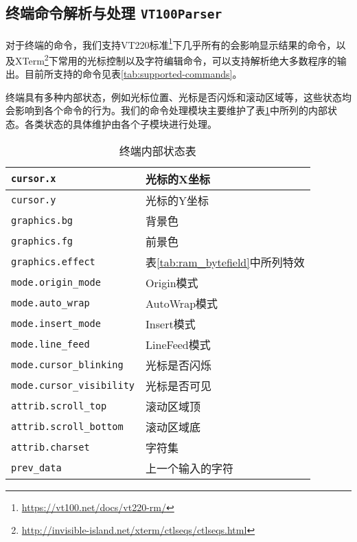  
\subsection{终端命令解析与处理 \texttt{VT100Parser}}

对于终端的命令，我们支持VT220标准\footnote{\url{https://vt100.net/docs/vt220-rm/}}下几乎所有的会影响显示结果的命令，以及XTerm\footnote{\url{http://invisible-island.net/xterm/ctlseqs/ctlseqs.html}}下常用的光标控制以及字符编辑命令，可以支持解析绝大多数程序的输出。目前所支持的命令见表\ref{tab:supported-commands}。

终端具有多种内部状态，例如光标位置、光标是否闪烁和滚动区域等，这些状态均会影响到各个命令的行为。我们的命令处理模块主要维护了表\ref{tab:inner-status}中所列的内部状态。各类状态的具体维护由各个子模块进行处理。

\begin{table}
	\centering
	\caption{终端内部状态表}
	\label{tab:inner-status}
	\begin{tabular}{|l|l|} \hline
		\texttt{cursor.x} & 光标的X坐标 \\ \hline
		\texttt{cursor.y} & 光标的Y坐标 \\ \hline
		\texttt{graphics.bg} & 背景色 \\ \hline
		\texttt{graphics.fg} & 前景色 \\ \hline
		\texttt{graphics.effect} & 表\ref{tab:ram_bytefield}中所列特效 \\ \hline
		\texttt{mode.origin\_mode} & Origin模式 \\ \hline
		\texttt{mode.auto\_wrap} & AutoWrap模式 \\ \hline
		\texttt{mode.insert\_mode} & Insert模式 \\ \hline
		\texttt{mode.line\_feed} & LineFeed模式 \\ \hline
		\texttt{mode.cursor\_blinking} & 光标是否闪烁 \\ \hline
		\texttt{mode.cursor\_visibility} & 光标是否可见 \\ \hline
		\texttt{attrib.scroll\_top} & 滚动区域顶 \\ \hline
		\texttt{attrib.scroll\_bottom} & 滚动区域底 \\ \hline
		\texttt{attrib.charset} & 字符集 \\ \hline
		\texttt{prev\_data} & 上一个输入的字符 \\ \hline
	\end{tabular}
\end{table}

